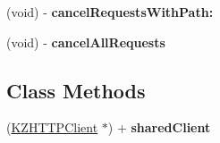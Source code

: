 \begin{DoxyCompactItemize}
\item 
\hypertarget{interface_k_z_h_t_t_p_client_a3bd8ddc5900700341803d45ce66a7c4c}{(void) -\/ {\bfseries cancel\-Requests\-With\-Path\-:}}\label{interface_k_z_h_t_t_p_client_a3bd8ddc5900700341803d45ce66a7c4c}

\item 
\hypertarget{interface_k_z_h_t_t_p_client_a818b25acfcfc585d1d7591ad8fb24cfd}{(void) -\/ {\bfseries cancel\-All\-Requests}}\label{interface_k_z_h_t_t_p_client_a818b25acfcfc585d1d7591ad8fb24cfd}

\end{DoxyCompactItemize}
\subsection*{Class Methods}
\begin{DoxyCompactItemize}
\item 
\hypertarget{interface_k_z_h_t_t_p_client_a06f44910143e1e5173866a0cff4c5efb}{(\hyperlink{interface_k_z_h_t_t_p_client}{K\-Z\-H\-T\-T\-P\-Client} $\ast$) + {\bfseries shared\-Client}}\label{interface_k_z_h_t_t_p_client_a06f44910143e1e5173866a0cff4c5efb}

\end{DoxyCompactItemize}
